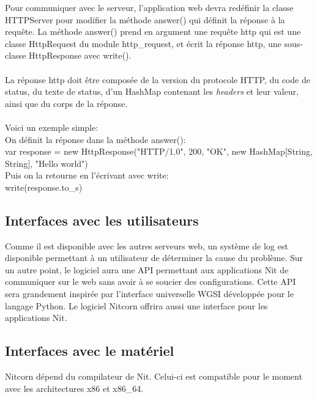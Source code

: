 \documentclass{scrreprt}
\begin{document}
Pour communiquer avec le serveur, l'application web devra redéfinir la classe HTTPServer pour modifier la méthode answer() qui définit la réponse à la requête. 
La méthode answer() prend en argument une requête http qui est une classe HttpRequest du module http_request, et écrit la réponse http, une sous-classe HttpResponse avec write().\\\\
La réponse http doit être composée de la version du protocole HTTP, du code de status, du texte de status, d'un HashMap contenant les \textit{headers} et leur valeur, ainsi que du corps de la réponse.\\\\
Voici un exemple simple:\\
On définit la réponse dans la méthode answer():\\
var response = new HttpResponse("HTTP/1.0", 200, "OK", new HashMap[String, String], "Hello world")\\
Puis on la retourne en l'écrivant avec write:\\
write(response.to_s)\\


\subsection{Interfaces avec les utilisateurs}
Comme il est disponible avec les autres serveurs web, un système de log est
disponible permettant à un utilisateur de déterminer la cause du problème. Sur
un autre point, le logiciel aura une API permettant aux applications Nit de
communiquer sur le web sans avoir à se soucier des configurations. Cette
API sera grandement inspirée par l'interface universelle WGSI développée pour
le langage Python. Le logiciel Nitcorn offrira aussi une interface pour les
applications Nit.

\subsection{Interfaces avec le matériel}
Nitcorn dépend du compilateur de Nit. Celui-ci est compatible pour le moment avec
les architectures x86 et x86_64.
\end{document}
